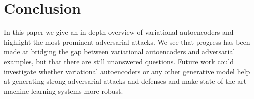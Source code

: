 \section{Conclusion}
In this paper we give an in depth overview of variational autoencoders and
highlight the most prominent adversarial attacks. We see that progress has been
made at bridging the gap between variational autoencoders and adversarial
examples, but that there are still unanswered questions. Future work could
investigate whether variational autoencoders or any other generative model help
at generating strong adversarial attacks and defenses and make state-of-the-art
machine learning systems more robust.